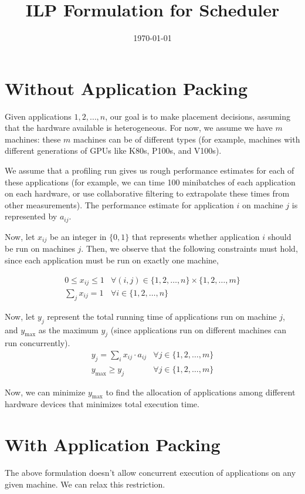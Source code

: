 \documentclass{article}
\title{ILP Formulation for Scheduler}
\date{\today}
\begin{document}
\maketitle

\section{Without Application Packing}
Given applications $1, 2, \ldots, n$, our goal is to make placement
decisions, assuming that the hardware available is heterogeneous. For now, we
assume we have $m$ machines: these $m$ machines can be of different types (for
example, machines with different generations of GPUs like K80s, P100s, and V100s).

We assume that a profiling run gives us rough performance estimates for each
of these applications (for example, we can time 100 minibatches of each application
on each hardware, or use collaborative filtering to extrapolate these
times from other measurements). The performance estimate for application $i$
on machine $j$ is represented by $a_{ij}$.

Now, let $x_{ij}$ be an integer in $\{0, 1\}$ that represents whether application $i$ should be run on
machines $j$. Then, we observe that the following constraints
must hold, since each application must be run on exactly one machine,

\begin{eqnarray}
0 \leq x_{ij} \leq 1 & \forall (i,j) \in \{1, 2, \ldots, n\} \times \{1, 2, \ldots, m\} \nonumber  \\
\sum_j x_{ij} = 1 & \forall i \in \{1, 2, \ldots, n\} \nonumber
\end{eqnarray}

Now, let $y_j$ represent the total running time of applications run on machine
$j$, and $y_{\text{max}}$ as the maximum $y_j$ (since applications run on different
machines can run concurrently).
\begin{eqnarray}
y_j = \sum_i x_{ij} \cdot a_{ij} & \forall j \in \{1, 2, \ldots, m\} \nonumber \\
y_{\text{max}} \geq y_j & \forall j \in \{1, 2, \ldots, m\} \nonumber
\end{eqnarray}

Now, we can minimize $y_{\text{max}}$ to find the allocation of applications
among different hardware devices that minimizes total execution time.

\section{With Application Packing}
The above formulation doesn't allow concurrent execution of applications
on any given machine. We can relax this restriction.
\end{document}
